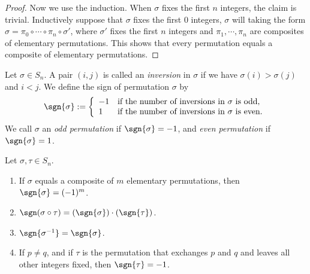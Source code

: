 \begin{subappendices}
\begin{proof}
    Now we use the induction. When $\sigma$ fixes the first $n$ integers, the claim is trivial. Inductively suppose that $\sigma$ fixes the first $0$ integers, $\sigma$ will taking the form $\sigma = \pi_0 \circ \cdots \circ \pi_n \circ \sigma'$, where $\sigma'$ fixes the first $n$ integers and $\pi_1, \cdots, \pi_n$ are composites of elementary permutations. This shows that every permutation equals a composite of elementary permutations.
\end{proof}

\begin{definition}
    Let $\sigma \in S_n$. A pair $(i, j)$ is called an \emph{inversion} in $\sigma$ if we have $\sigma(i) > \sigma(j)$ and $i < j$. We define the sign of permutation $\sigma$ by
    \begin{align*}
        \sgn{\sigma} := \left\{\begin{array}{ll}
            -1&\text{if the number of inversions in $\sigma$ is odd,}\\
            1&\text{if the number of inversions in $\sigma$ is even.}
        \end{array}\right.
    \end{align*}
    We call $\sigma$ an \emph{odd permutation} if $\sgn{\sigma} = -1$, and \emph{even permutation} if $\sgn{\sigma} = 1$.
\end{definition}


\begin{lemma}\label{lem:property of sign}
    Let $\sigma, \tau \in S_n$.
    \begin{enumerate}
        \item If $\sigma$ equals a composite of $m$ elementary permutations, then $\sgn{\sigma} = (-1)^m$.
        \item $\sgn(\sigma \circ \tau) = (\sgn{\sigma}) \cdot (\sgn{\tau})$.
        \item $\sgn{\sigma^{-1}} = \sgn{\sigma}$.
        \item If $p \neq q$, and if $\tau$ is the permutation that exchanges $p$ and $q$ and leaves all other integers fixed, then $\sgn{\tau} = -1$.
    \end{enumerate}
\end{lemma}

\end{subappendices}
